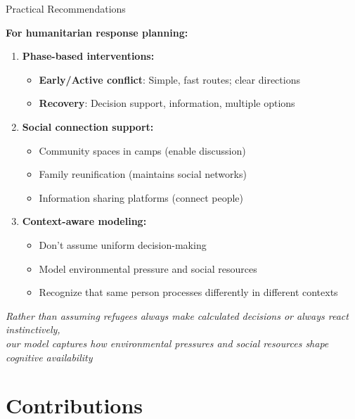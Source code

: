 \documentclass[aspectratio=169]{beamer}
\begin{document}
\begin{frame}{Practical Recommendations}

\textbf{For humanitarian response planning:}

\begin{enumerate}
    \item \textbf{Phase-based interventions:}
    \begin{itemize}
        \item \textbf{Early/Active conflict}: Simple, fast routes; clear directions
        \item \textbf{Recovery}: Decision support, information, multiple options
    \end{itemize}
    
    \item \textbf{Social connection support:}
    \begin{itemize}
        \item Community spaces in camps (enable discussion)
        \item Family reunification (maintains social networks)
        \item Information sharing platforms (connect people)
    \end{itemize}
    
    \item \textbf{Context-aware modeling:}
    \begin{itemize}
        \item Don't assume uniform decision-making
        \item Model environmental pressure and social resources
        \item Recognize that same person processes differently in different contexts
    \end{itemize}
\end{enumerate}

\vspace{1em}

\centering
\textit{Rather than assuming refugees always make calculated decisions or always react instinctively,\\
our model captures how environmental pressures and social resources shape cognitive availability}

\end{frame}

\section{Contributions}
\end{document}
